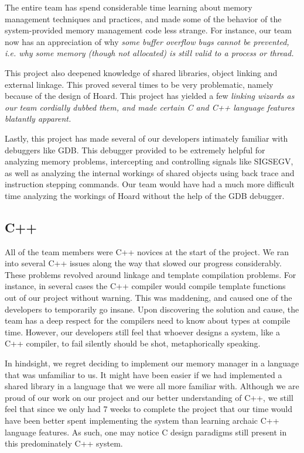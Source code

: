 \documentclass[9pt]{sig-alternate-10pt}
\begin{document}
The entire team has spend considerable time learning about memory management techniques and practices, and made some of the behavior of the system-provided memory management code less strange.  For instance, our team now has an appreciation of why \em some \em buffer overflow bugs cannot be prevented, i.e. why some memory (though not allocated) is still valid to a process or thread.

This project also deepened knowledge of shared libraries, object linking and external linkage.  This proved several times to be very problematic, namely because of the design of Hoard.  This project has yielded a few \em linking wizards \em as our team cordially dubbed them, and made certain C and C++ language features blatantly apparent.

Lastly, this project has made several of our developers intimately familiar with debuggers like GDB.  This debugger provided to be extremely helpful for analyzing memory problems, intercepting and controlling signals like SIGSEGV, as well as analyzing the internal workings of shared objects using back trace and instruction stepping commands.  Our team would have had a much more difficult time analyzing the workings of Hoard without the help of the GDB debugger.

\subsection{C++}
All of the team members were C++ novices at the start of the project. We ran into several C++ issues along the way that slowed our progress considerably. These problems revolved around linkage and template compilation problems.  For instance, in several cases the C++ compiler would compile template functions out of our project without warning.  This was maddening, and caused one of the developers to temporarily go insane.  Upon discovering the solution and cause, the team has a deep respect for the compilers need to know about types at compile time.  However, our developers still feel that whoever designs a system, like a C++ compiler, to fail silently should be shot, metaphorically speaking.

In hindsight, we regret deciding to implement our memory manager in a language that was unfamiliar to us. It might have been easier if we had implemented a shared library in a language that we were all more familiar with. Although we are proud of our work on our project and our better understanding of C++, we still feel that since we only had 7 weeks to complete the project that our time would have been better spent implementing the system than learning archaic C++ language features.  As such, one may notice C design paradigms still present in this predominately C++ system.
\end{document}
